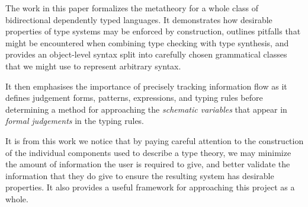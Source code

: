 The work in this paper formalizes the metatheory for a whole class of
bidirectional dependently typed languages. It demonstrates how
desirable properties of type systems may be enforced by construction,
outlines pitfalls that might be encountered when combining type
checking with type synthesis, and provides an object-level
syntax split into carefully chosen grammatical classes that we might
use to represent arbitrary syntax.

It then emphasises the importance of precisely tracking information
flow as it defines judgement forms, patterns, expressions, and typing
rules before determining a method for approaching the \emph{schematic
  variables} that appear in \emph{formal judgements} in the typing
rules.

It is from this work we notice that by paying
careful attention to the construction of the individual components used to
describe a type theory, we may minimize the amount of information
the user is required to give, and better validate the information that
they do give to ensure the resulting system has desirable
properties. It also provides a useful framework for approaching
this project as a whole.

